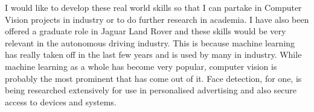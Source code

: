 I would like to develop these real world skills so that I can partake in
Computer Vision projects in industry or to do further research in academia.
I have also been offered a graduate role in Jaguar Land Rover and these skills
would be very relevant in the autonomous driving industry.
This is because machine learning has really taken off in the last few years and is
used by many in industry. While machine learning as a whole has become very
popular, computer vision is probably the most prominent that has come out of it.
Face detection, for one, is being researched extensively for use in personalised
advertising and also secure access to devices and systems.
